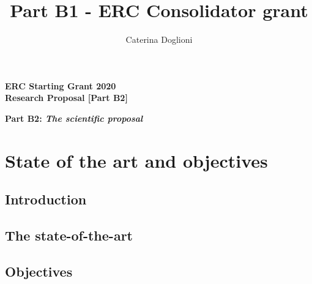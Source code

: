 \documentclass[11pt,a4paper]{article}
\title{{\Large Part B1 - ERC Consolidator grant}}
\author{{\normalsize Caterina Doglioni}}
\date{}                                           %
\begin{document}
\begin{center} 

{\Large\bf ERC Starting Grant 2020} \\
 {\Large\bf Research Proposal [Part B2]}  \\
\vspace{2cm} 
\end{center} 

{\Large{\bf Part B2: {\it{The scientific proposal}}}}

\section{State of the art and objectives}
\smallskip
%
\subsection*{Introduction}
\smallskip



\subsection{The state-of-the-art}
\smallskip





\subsection{Objectives}
\smallskip
\end{document}
